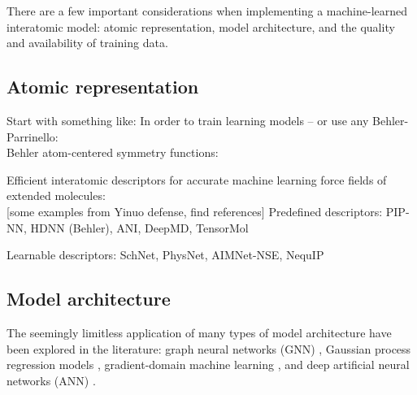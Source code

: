 There are a few important considerations when implementing a machine-learned interatomic model: atomic representation, model architecture, and the quality and availability of training data. 


\subsection{Atomic representation}
Start with something like: 
In order to train learning models -- or use any 
Behler-Parrinello: \cite{behler_parrinello}\\
Behler atom-centered symmetry functions: \cite{atom_centered_symmetry_function_behler}\\


Efficient interatomic descriptors for accurate machine learning force fields of extended molecules: \cite{interatomic_descriptors_kabylda}\\

[some examples from Yinuo defense, find references]
Predefined descriptors: PIP-NN, HDNN (Behler), ANI, DeepMD, TensorMol 

Learnable descriptors: SchNet, PhysNet, AIMNet-NSE, NequIP




\subsection{Model architecture}


The seemingly limitless application of many types of model architecture have been explored in the literature:
graph neural networks (GNN) \cite{gnn_property_prediction1, gnn_property_prediction2}, 
Gaussian process regression models \cite{gaussian_process_regression1,gaussian_process_regression2}, 
gradient-domain machine learning \cite{ml_energy_conserving_ff_chmiela}, 
and deep artificial neural networks (ANN) \cite{pes_fitted_by_NN_handley, ab_initio_pes_using_ml_lu, ml_pes_jiang}. 

